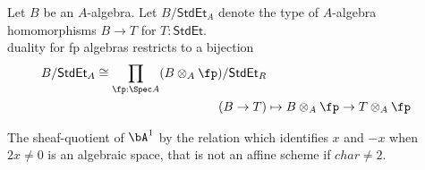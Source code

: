 \begin{lemma}
	Let $B$ be an $A$-algebra. Let $B / \mathsf{StdEt}_A$ denote the type of $A$-algebra homomorphisms $B \to T$ for $T : \mathsf{StdEt}$. \\
	duality for fp algebras restricts to a bijection
	\begin{align*}
		B / \mathsf{StdEt}_A \cong \prod_{\fp : \Spec A} (B \otimes_A \fp )  / \mathsf{StdEt}_R \\
		(B \to T) &\mapsto B \otimes_A \fp \to T \otimes_A \fp
	\end{align*}
\end{lemma}



\begin{example}
	The sheaf-quotient of $\bA^1$ by the relation which identifies $x$ and $-x$ when $2x \neq 0$ is an algebraic space, that is not an affine scheme if $char \neq 2$.
\end{example}
